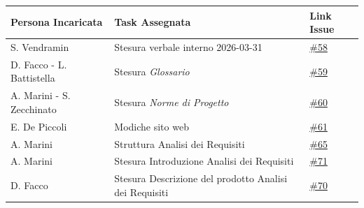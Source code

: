 \documentclass[a4paper, 10pt, colorlinks=true, linkcolor=black, urlcolor=blue, citecolor=blue, hidelinks]{article}
\newcommand{\issue}[1]{\href{https://github.com/thebitless-group-swe/thebitless.github.io/issues/#1}{\##1}}
\begin{document}
\begin{center}
    \renewcommand{\arraystretch}{1.4}
        \begin{tabular}{|p{4.2cm}|p{6.2cm}|p{2.2cm}|}
        \hline
        \textbf{Persona Incaricata} & \textbf{Task Assegnata} & \centering\textbf{Link Issue} \tabularnewline
        \hline
        S. Vendramin & Stesura verbale interno 2026-03-31 & \issue{58} \\
        \hline
        D. Facco - L. Battistella & Stesura \textit{Glossario} & \issue{59} \\
        \hline
        A. Marini - S. Zecchinato & Stesura \textit{Norme di Progetto} & \issue{60} \\
        \hline
        E. De Piccoli & Modiche sito web & \issue{61} \\
        \hline
        A. Marini & Struttura Analisi dei Requisiti & \issue{65} \\
        \hline
        A. Marini & Stesura Introduzione Analisi dei Requisiti & \issue{71} \\
        \hline
        D. Facco & Stesura Descrizione del prodotto Analisi dei Requisiti & \issue{70} \\
        \hline
    \end{tabular}
\end{center}


\appendix
\end{document}
